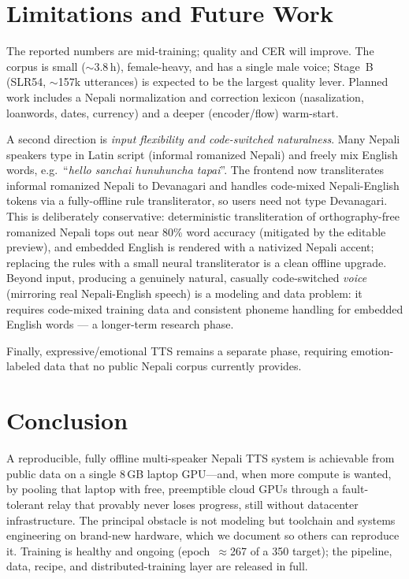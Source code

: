 \documentclass[conference]{IEEEtran}
\begin{document}
\section{Limitations and Future Work}
\label{sec:future}
The reported numbers are mid-training; quality and CER will improve. The corpus is small ($\sim$3.8\,h),
female-heavy, and has a single male voice; Stage~B (SLR54, $\sim$157k utterances) is expected to be the
largest quality lever. Planned work includes a Nepali normalization and correction lexicon (nasalization,
loanwords, dates, currency) and a deeper (encoder/flow) warm-start.

A second direction is \emph{input flexibility and code-switched naturalness}. Many Nepali speakers type in
Latin script (informal romanized Nepali) and freely mix English words, e.g.\ ``\textit{hello sanchai
hunuhuncha tapai}''. The frontend now transliterates informal romanized Nepali to Devanagari and handles
code-mixed Nepali-English tokens via a fully-offline rule transliterator, so users need not type Devanagari.
This is deliberately conservative: deterministic transliteration of orthography-free romanized Nepali tops out
near 80\% word accuracy (mitigated by the editable preview), and embedded English is rendered with a nativized
Nepali accent; replacing the rules with a small neural transliterator is a clean offline upgrade. Beyond
input, producing a genuinely natural, casually code-switched \emph{voice} (mirroring real Nepali-English
speech) is a modeling and data problem: it requires code-mixed training data and consistent phoneme handling
for embedded English words --- a longer-term research phase.

Finally, expressive/emotional TTS remains a separate phase, requiring emotion-labeled data that no public
Nepali corpus currently provides.

\section{Conclusion}
A reproducible, fully offline multi-speaker Nepali TTS system is achievable from public data on a single
8\,GB laptop GPU---and, when more compute is wanted, by pooling that laptop with free, preemptible cloud GPUs
through a fault-tolerant relay that provably never loses progress, still without datacenter infrastructure.
The principal obstacle is not modeling but toolchain and systems engineering on brand-new hardware, which we
document so others can reproduce it. Training is healthy and ongoing (epoch~$\approx$267 of a 350 target); the
pipeline, data, recipe, and distributed-training layer are released in full.
\end{document}
